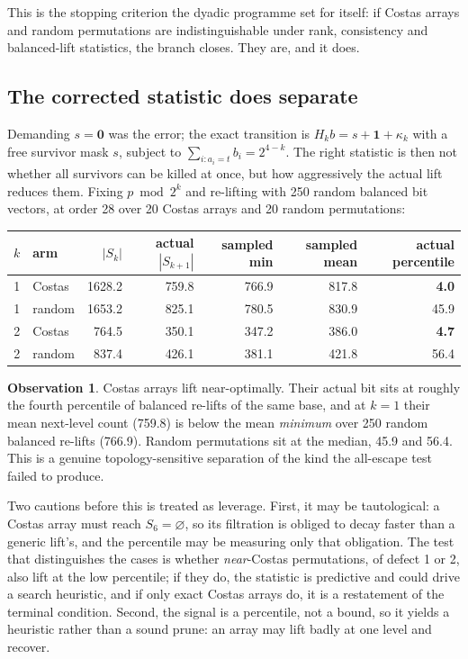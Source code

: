 \documentclass[11pt,a4paper]{article}
\theoremstyle{definition}
\newtheorem{observation}[theorem]{Observation}
\begin{document}
This is the stopping criterion the dyadic programme set for itself: if Costas
arrays and random permutations are indistinguishable under rank, consistency and
balanced-lift statistics, the branch closes. They are, and it does. \subsection{The corrected statistic does separate}
\label{sec:muk}

Demanding $s=\mathbf0$ was the error; the exact transition is
$H_k b = s+\mathbf1+\kappa_k$ with a free survivor mask $s$, subject to
$\sum_{i:a_i=t}b_i = 2^{4-k}$. The right statistic is then not whether all
survivors can be killed at once, but how aggressively the actual lift reduces
them. Fixing $p \bmod 2^k$ and re-lifting with 250 random balanced bit vectors,
at order 28 over 20 Costas arrays and 20 random permutations:

\begin{center}
\begin{tabular}{@{}rlrrrrr@{}}
\toprule
$k$ & arm & $|S_k|$ & actual $|S_{k+1}|$ & sampled min & sampled mean & actual percentile \\
\midrule
1 & Costas & 1628.2 & 759.8 & 766.9 & 817.8 & \textbf{4.0} \\
1 & random & 1653.2 & 825.1 & 780.5 & 830.9 & 45.9 \\
2 & Costas & 764.5 & 350.1 & 347.2 & 386.0 & \textbf{4.7} \\
2 & random & 837.4 & 426.1 & 381.1 & 421.8 & 56.4 \\
\bottomrule
\end{tabular}
\end{center}

\begin{observation}
\label{obs:muk}
Costas arrays lift near-optimally. Their actual bit sits at roughly the fourth
percentile of balanced re-lifts of the same base, and at $k=1$ their mean
next-level count (759.8) is below the mean \emph{minimum} over 250 random
balanced re-lifts (766.9). Random permutations sit at the median, 45.9 and 56.4.
This is a genuine topology-sensitive separation of the kind the all-escape test
failed to produce.
\end{observation}

Two cautions before this is treated as leverage. First, it may be tautological:
a Costas array must reach $S_6=\varnothing$, so its filtration is obliged to
decay faster than a generic lift's, and the percentile may be measuring only that
obligation. The test that distinguishes the cases is whether \emph{near}-Costas
permutations, of defect 1 or 2, also lift at the low percentile; if they do, the
statistic is predictive and could drive a search heuristic, and if only exact
Costas arrays do, it is a restatement of the terminal condition. Second, the
signal is a percentile, not a bound, so it yields a heuristic rather than a sound
prune: an array may lift badly at one level and recover.
\end{document}
